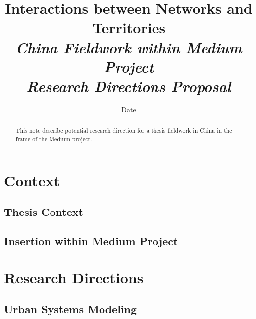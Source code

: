 


\title{Interactions between Networks and Territories\\
\textit{China Fieldwork within Medium Project}\\
\textit{Research Directions Proposal}
}
\author{}
\date{Date}


\maketitle

\justify


\begin{abstract}
This note describe potential research direction for a thesis fieldwork in China in the frame of the Medium project.
\end{abstract}



\section{Context}

\subsection{Thesis Context}




\subsection{Insertion within Medium Project}





\section{Research Directions}

\subsection{Urban Systems Modeling}

%
%



